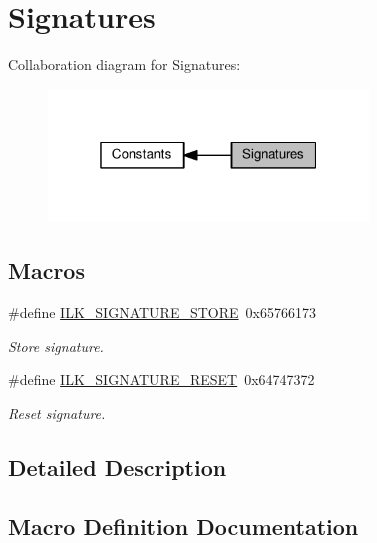 \hypertarget{group__IL__CONST__SIGNATURES}{}\section{Signatures}
\label{group__IL__CONST__SIGNATURES}
Collaboration diagram for Signatures\+:\nopagebreak
\begin{figure}[H]
\begin{center}
\leavevmode
\includegraphics[width=241pt]{group__IL__CONST__SIGNATURES}
\end{center}
\end{figure}
\subsection*{Macros}
\begin{DoxyCompactItemize}
\item 
\#define \hyperlink{group__IL__CONST__SIGNATURES_ga4c86aee7016ece956e15b5d1523fbc07}{I\+L\+K\+\_\+\+S\+I\+G\+N\+A\+T\+U\+R\+E\+\_\+\+S\+T\+O\+RE}~0x65766173
\begin{DoxyCompactList}\small\item\em Store signature. \end{DoxyCompactList}\item 
\#define \hyperlink{group__IL__CONST__SIGNATURES_gafec6f03943f9194696a21de117dedbfc}{I\+L\+K\+\_\+\+S\+I\+G\+N\+A\+T\+U\+R\+E\+\_\+\+R\+E\+S\+ET}~0x64747372
\begin{DoxyCompactList}\small\item\em Reset signature. \end{DoxyCompactList}\end{DoxyCompactItemize}


\subsection{Detailed Description}


\subsection{Macro Definition Documentation}
